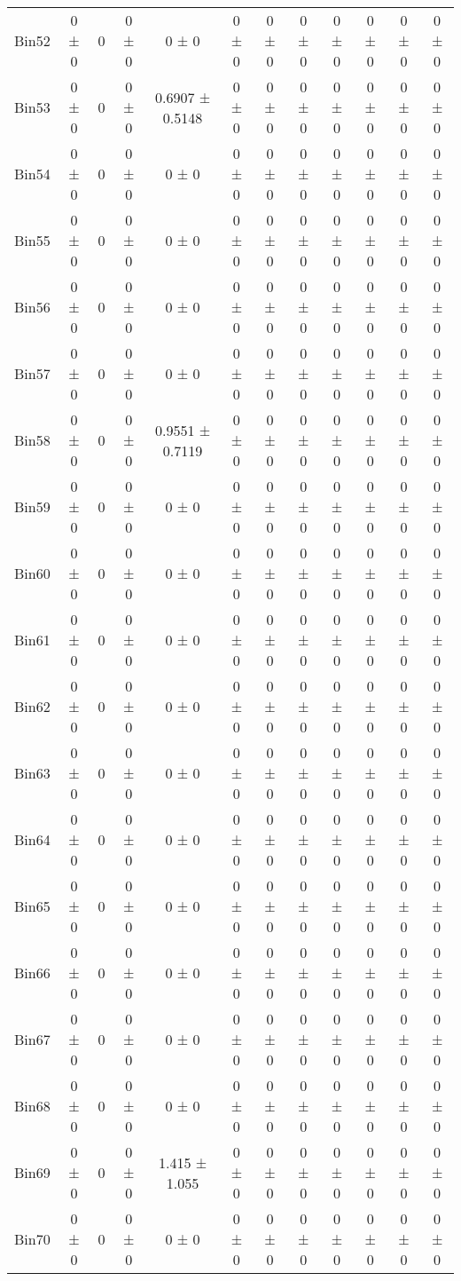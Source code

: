 \begin{tabular}{@{\extracolsep{4pt}}lccccccccccc@{}}
     Bin52 & 0 ± 0 & 0 & 0 ± 0 & 0 ± 0 & 0 ± 0 & 0 ± 0 & 0 ± 0 & 0 ± 0 & 0 ± 0 & 0 ± 0 & 0 ± 0 \\ 
     Bin53 & 0 ± 0 & 0 & 0 ± 0 & 0.6907 ± 0.5148 & 0 ± 0 & 0 ± 0 & 0 ± 0 & 0 ± 0 & 0 ± 0 & 0 ± 0 & 0 ± 0 \\ 
     Bin54 & 0 ± 0 & 0 & 0 ± 0 & 0 ± 0 & 0 ± 0 & 0 ± 0 & 0 ± 0 & 0 ± 0 & 0 ± 0 & 0 ± 0 & 0 ± 0 \\ 
     Bin55 & 0 ± 0 & 0 & 0 ± 0 & 0 ± 0 & 0 ± 0 & 0 ± 0 & 0 ± 0 & 0 ± 0 & 0 ± 0 & 0 ± 0 & 0 ± 0 \\ 
     Bin56 & 0 ± 0 & 0 & 0 ± 0 & 0 ± 0 & 0 ± 0 & 0 ± 0 & 0 ± 0 & 0 ± 0 & 0 ± 0 & 0 ± 0 & 0 ± 0 \\ 
     Bin57 & 0 ± 0 & 0 & 0 ± 0 & 0 ± 0 & 0 ± 0 & 0 ± 0 & 0 ± 0 & 0 ± 0 & 0 ± 0 & 0 ± 0 & 0 ± 0 \\ 
     Bin58 & 0 ± 0 & 0 & 0 ± 0 & 0.9551 ± 0.7119 & 0 ± 0 & 0 ± 0 & 0 ± 0 & 0 ± 0 & 0 ± 0 & 0 ± 0 & 0 ± 0 \\ 
     Bin59 & 0 ± 0 & 0 & 0 ± 0 & 0 ± 0 & 0 ± 0 & 0 ± 0 & 0 ± 0 & 0 ± 0 & 0 ± 0 & 0 ± 0 & 0 ± 0 \\ 
     Bin60 & 0 ± 0 & 0 & 0 ± 0 & 0 ± 0 & 0 ± 0 & 0 ± 0 & 0 ± 0 & 0 ± 0 & 0 ± 0 & 0 ± 0 & 0 ± 0 \\ 
     Bin61 & 0 ± 0 & 0 & 0 ± 0 & 0 ± 0 & 0 ± 0 & 0 ± 0 & 0 ± 0 & 0 ± 0 & 0 ± 0 & 0 ± 0 & 0 ± 0 \\ 
     Bin62 & 0 ± 0 & 0 & 0 ± 0 & 0 ± 0 & 0 ± 0 & 0 ± 0 & 0 ± 0 & 0 ± 0 & 0 ± 0 & 0 ± 0 & 0 ± 0 \\ 
     Bin63 & 0 ± 0 & 0 & 0 ± 0 & 0 ± 0 & 0 ± 0 & 0 ± 0 & 0 ± 0 & 0 ± 0 & 0 ± 0 & 0 ± 0 & 0 ± 0 \\ 
     Bin64 & 0 ± 0 & 0 & 0 ± 0 & 0 ± 0 & 0 ± 0 & 0 ± 0 & 0 ± 0 & 0 ± 0 & 0 ± 0 & 0 ± 0 & 0 ± 0 \\ 
     Bin65 & 0 ± 0 & 0 & 0 ± 0 & 0 ± 0 & 0 ± 0 & 0 ± 0 & 0 ± 0 & 0 ± 0 & 0 ± 0 & 0 ± 0 & 0 ± 0 \\ 
     Bin66 & 0 ± 0 & 0 & 0 ± 0 & 0 ± 0 & 0 ± 0 & 0 ± 0 & 0 ± 0 & 0 ± 0 & 0 ± 0 & 0 ± 0 & 0 ± 0 \\ 
     Bin67 & 0 ± 0 & 0 & 0 ± 0 & 0 ± 0 & 0 ± 0 & 0 ± 0 & 0 ± 0 & 0 ± 0 & 0 ± 0 & 0 ± 0 & 0 ± 0 \\ 
     Bin68 & 0 ± 0 & 0 & 0 ± 0 & 0 ± 0 & 0 ± 0 & 0 ± 0 & 0 ± 0 & 0 ± 0 & 0 ± 0 & 0 ± 0 & 0 ± 0 \\ 
     Bin69 & 0 ± 0 & 0 & 0 ± 0 & 1.415 ± 1.055 & 0 ± 0 & 0 ± 0 & 0 ± 0 & 0 ± 0 & 0 ± 0 & 0 ± 0 & 0 ± 0 \\ 
     Bin70 & 0 ± 0 & 0 & 0 ± 0 & 0 ± 0 & 0 ± 0 & 0 ± 0 & 0 ± 0 & 0 ± 0 & 0 ± 0 & 0 ± 0 & 0 ± 0 \\ 

\end{tabular}
